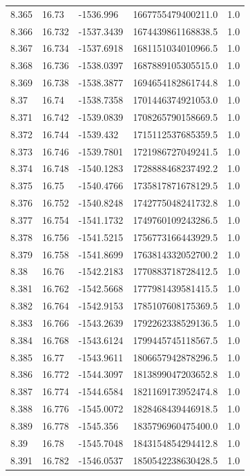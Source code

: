 \begin{tabular}{lllll}
8.365 & 16.73 & -1536.996 & 1667755479400211.0 & 1.0 \\
8.366 & 16.732 & -1537.3439 & 1674439861168838.5 & 1.0 \\
8.367 & 16.734 & -1537.6918 & 1681151034010966.5 & 1.0 \\
8.368 & 16.736 & -1538.0397 & 1687889105305515.0 & 1.0 \\
8.369 & 16.738 & -1538.3877 & 1694654182861744.8 & 1.0 \\
8.37 & 16.74 & -1538.7358 & 1701446374921053.0 & 1.0 \\
8.371 & 16.742 & -1539.0839 & 1708265790158669.5 & 1.0 \\
8.372 & 16.744 & -1539.432 & 1715112537685359.5 & 1.0 \\
8.373 & 16.746 & -1539.7801 & 1721986727049241.5 & 1.0 \\
8.374 & 16.748 & -1540.1283 & 1728888468237492.2 & 1.0 \\
8.375 & 16.75 & -1540.4766 & 1735817871678129.5 & 1.0 \\
8.376 & 16.752 & -1540.8248 & 1742775048241732.8 & 1.0 \\
8.377 & 16.754 & -1541.1732 & 1749760109243286.5 & 1.0 \\
8.378 & 16.756 & -1541.5215 & 1756773166443929.5 & 1.0 \\
8.379 & 16.758 & -1541.8699 & 1763814332052700.2 & 1.0 \\
8.38 & 16.76 & -1542.2183 & 1770883718728412.5 & 1.0 \\
8.381 & 16.762 & -1542.5668 & 1777981439581415.5 & 1.0 \\
8.382 & 16.764 & -1542.9153 & 1785107608175369.5 & 1.0 \\
8.383 & 16.766 & -1543.2639 & 1792262338529136.5 & 1.0 \\
8.384 & 16.768 & -1543.6124 & 1799445745118567.5 & 1.0 \\
8.385 & 16.77 & -1543.9611 & 1806657942878296.5 & 1.0 \\
8.386 & 16.772 & -1544.3097 & 1813899047203652.8 & 1.0 \\
8.387 & 16.774 & -1544.6584 & 1821169173952474.8 & 1.0 \\
8.388 & 16.776 & -1545.0072 & 1828468439446918.5 & 1.0 \\
8.389 & 16.778 & -1545.356 & 1835796960475400.0 & 1.0 \\
8.39 & 16.78 & -1545.7048 & 1843154854294412.8 & 1.0 \\
8.391 & 16.782 & -1546.0537 & 1850542238630428.5 & 1.0 \\

\end{tabular}
